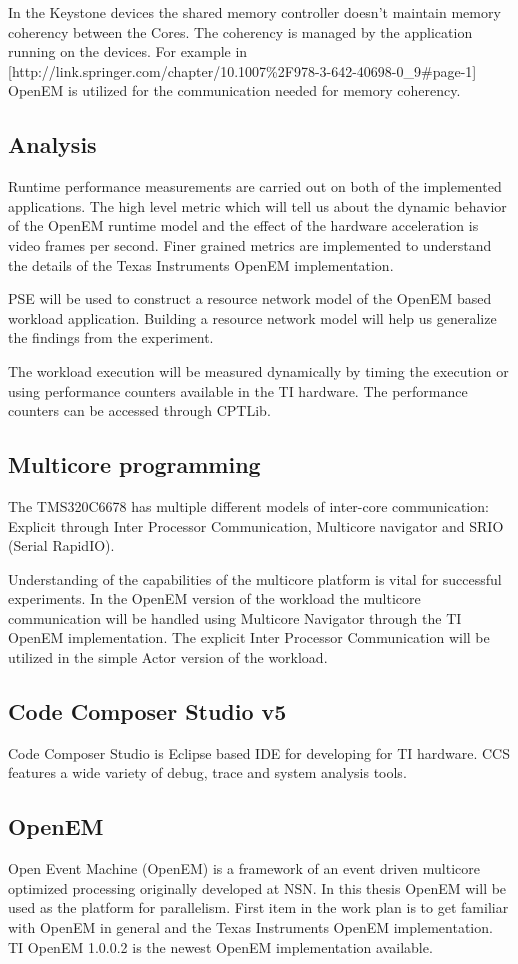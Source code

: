 In the Keystone devices the shared memory controller doesn't maintain memory coherency between the Cores. The coherency is managed by the application running on the devices. For example in [http://link.springer.com/chapter/10.1007\%2F978-3-642-40698-0\_9\#page-1] OpenEM is utilized for the communication needed for memory coherency.

\subsection{Analysis}
Runtime performance measurements are carried out on both of the implemented applications. The high level metric which will tell us about the dynamic behavior of the OpenEM runtime model and the effect of the hardware acceleration is video frames per second. Finer grained metrics are implemented to understand the details of the Texas Instruments OpenEM implementation.

PSE will be used to construct a resource network model of the OpenEM based workload application. Building a resource network model will help us generalize the findings from the experiment.

The workload execution will be measured dynamically by timing the execution or using performance counters available in the TI hardware. The performance counters can be accessed through CPTLib.
\subsection{Multicore programming}
The TMS320C6678 has multiple different models of inter-core communication: Explicit through Inter Processor Communication, Multicore navigator and SRIO (Serial RapidIO).

Understanding of the capabilities of the multicore platform is vital for successful experiments. In the OpenEM version of the workload the multicore communication will be handled using Multicore Navigator through the TI OpenEM implementation. The explicit Inter Processor Communication will be utilized in the simple Actor version of the workload.

\subsection{Code Composer Studio v5}
Code Composer Studio is Eclipse based IDE for developing for TI hardware. CCS features a wide variety of debug, trace and system analysis tools.
\subsection{OpenEM}
Open Event Machine (OpenEM) is a framework of an event driven multicore optimized processing originally developed at NSN. In this thesis OpenEM will be used as the platform for parallelism. First item in the work plan is to get familiar with OpenEM in general and the Texas Instruments OpenEM implementation. TI OpenEM 1.0.0.2 is the newest OpenEM implementation available.

